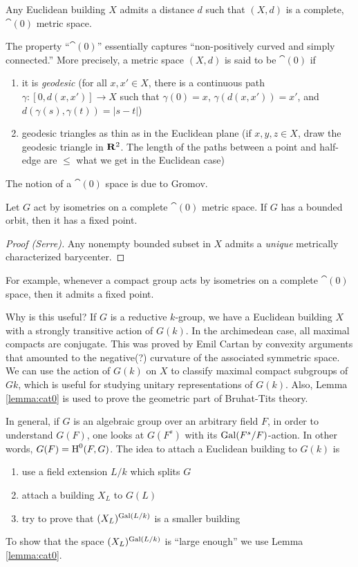 \documentclass{article}
\begin{document}
\begin{theorem}
Any Euclidean building $X$ admits a distance $d$ such that $(X,d)$ is a 
complete, $\cat(0)$ metric space. 
\end{theorem}

The property ``$\cat(0)$'' essentially captures ``non-positively curved and 
simply connected.'' More precisely, a metric space $(X,d)$ is said to be 
$\cat(0)$ if 
\begin{enumerate}
  \item it is \emph{geodesic} (for all $x,x'\in X$, there is a continuous 
    path $\gamma:[0,d(x,x')] \to X$ such that $\gamma(0)=x$, $\gamma(d(x,x'))=x'$, 
    and $d(\gamma(s),\gamma(t)) = |s-t|$) 
  \item geodesic triangles as thin as in the Euclidean plane (if 
    $x,y,z\in X$, draw the geodesic triangle in $\mathbf{R}^2$. The length of the 
    paths between a point and half-edge are $\leqslant$ what we get in the 
    Euclidean case)
\end{enumerate}

The notion of a $\cat(0)$ space is due to Gromov. 

\begin{lemma}\label{lemma:cat0}
Let $G$ act by isometries on a complete $\cat(0)$ metric space. If $G$ has a 
bounded orbit, then it has a fixed point. 
\end{lemma}
\begin{proof}[Proof (Serre)]
Any nonempty bounded subset in $X$ admits a \emph{unique} metrically characterized 
barycenter. 
\end{proof}

For example, whenever a compact group acts by isometries on a complete 
$\cat(0)$ space, then it admits a fixed point. 

Why is this useful? If $G$ is a reductive $k$-group, we have a Euclidean building 
$X$ with a strongly transitive action of $G(k)$. In the archimedean case, 
all maximal compacts are conjugate. This was proved by Emil Cartan by convexity 
arguments that amounted to the negative(?) curvature of the associated symmetric 
space. We can use the action of $G(k)$ on $X$ to classify maximal compact 
subgroups of $Gk$, which is useful for studying unitary representations of $G(k)$. 
Also, Lemma \ref{lemma:cat0} is used to prove the geometric part of Bruhat-Tits 
theory. 

In general, if $G$ is an algebraic group over an arbitrary field $F$, in order 
to understand $G(F)$, one looks at $G(F^s)$ with its $\operatorname{Gal}(F^s/F)$-action. 
In other words, $G(F)=\operatorname{H}^0(F,G)$. The idea to attach a Euclidean building to 
$G(k)$ is 
\begin{enumerate}
  \item use a field extension $L/k$ which splits $G$
  \item attach a building $X_L$ to $G(L)$
  \item try to prove that $(X_L)^{\operatorname{Gal}(L/k)}$ is a smaller building
\end{enumerate}
To show that the space $(X_L)^{\operatorname{Gal}(L/k)}$ is ``large enough'' we use 
Lemma \ref{lemma:cat0}. 
\end{document}
